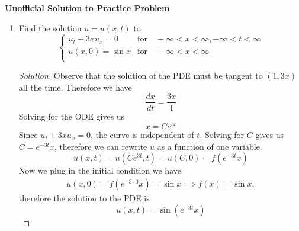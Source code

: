 \documentclass[12pt,letterpaper]{article}
\begin{document}
\begin{center}
    {\Large \textbf{Unofficial Solution to Practice Problem}}
\end{center}
\begin{enumerate}
	\item Find the solution $u = u(x,t)$ to
	\[ \left\{ \begin{array}{ll} 
		u_t + 3xu_x = 0 & \mathrm{for} \quad - \infty < x < \infty, -\infty < t < \infty \\
		u(x,0) = \sin x & \mathrm{for} \quad -\infty < x < \infty \\
	\end{array} \right. \]
	\begin{proof}[Solution]
		Observe that the solution of the PDE must be tangent to $(1,3x)$ all the time. Therefore we have
		\[ \frac{dx}{dt} = \frac{3x}{1} \]
		Solving for the ODE gives us
		\[ x = Ce^{3t} \]
		Since $ u_t + 3xu_x = 0$, the curve is independent of $t$. Solving for $C$ gives us $C = e^{-3t}x$, therefore we can rewrite $u$ as a function of one variable.
		\[u(x,t) = u(Ce^{3t},t) = u(C,0) = f(e^{-3t}x)\]
		Now we plug in the initial condition we have
		\begin{align*}
		 	u(x,0) = f(e^{-3 \cdot 0} x) = \sin x \implies f(x) = \sin x, 
		\end{align*}
		therefore the solution to the PDE is
		\[ u(x,t) = \sin(e^{-3t}x)\]
		

\end{proof}
\end{enumerate}
\end{document}
